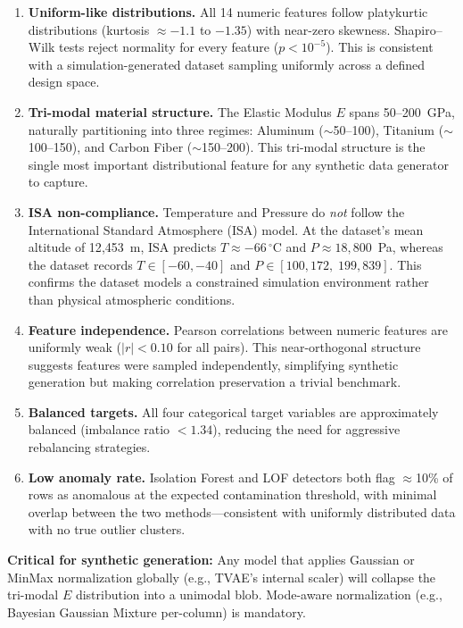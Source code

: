 \documentclass[11pt, a4paper]{report}
\begin{document}
\begin{enumerate}[leftmargin=*, itemsep=4pt]
\item \textbf{Uniform-like distributions.} All 14 numeric features follow platykurtic distributions (kurtosis $\approx -1.1$ to $-1.35$) with near-zero skewness. Shapiro--Wilk tests reject normality for every feature ($p < 10^{-5}$). This is consistent with a simulation-generated dataset sampling uniformly across a defined design space.

\item \textbf{Tri-modal material structure.} The Elastic Modulus $E$ spans 50--200~GPa, naturally partitioning into three regimes: Aluminum ($\sim$50--100), Titanium ($\sim$100--150), and Carbon Fiber ($\sim$150--200). This tri-modal structure is the single most important distributional feature for any synthetic data generator to capture.

\item \textbf{ISA non-compliance.} Temperature and Pressure do \emph{not} follow the International Standard Atmosphere (ISA) model. At the dataset's mean altitude of 12{,}453~m, ISA predicts $T \approx -66\,^{\circ}$C and $P \approx 18{,}800$~Pa, whereas the dataset records $T \in [-60, -40]$ and $P \in [100{,}172,\; 199{,}839]$. This confirms the dataset models a constrained simulation environment rather than physical atmospheric conditions.

\item \textbf{Feature independence.} Pearson correlations between numeric features are uniformly weak ($|r| < 0.10$ for all pairs). This near-orthogonal structure suggests features were sampled independently, simplifying synthetic generation but making correlation preservation a trivial benchmark.

\item \textbf{Balanced targets.} All four categorical target variables are approximately balanced (imbalance ratio $< 1.34$), reducing the need for aggressive rebalancing strategies.

\item \textbf{Low anomaly rate.} Isolation Forest and LOF detectors both flag $\approx$10\% of rows as anomalous at the expected contamination threshold, with minimal overlap between the two methods---consistent with uniformly distributed data with no true outlier clusters.
\end{enumerate}

\begin{warningbox}
\textbf{Critical for synthetic generation:} Any model that applies Gaussian or MinMax normalization globally (e.g., TVAE's internal scaler) will collapse the tri-modal $E$ distribution into a unimodal blob. Mode-aware normalization (e.g., Bayesian Gaussian Mixture per-column) is mandatory.
\end{warningbox}
\end{document}
